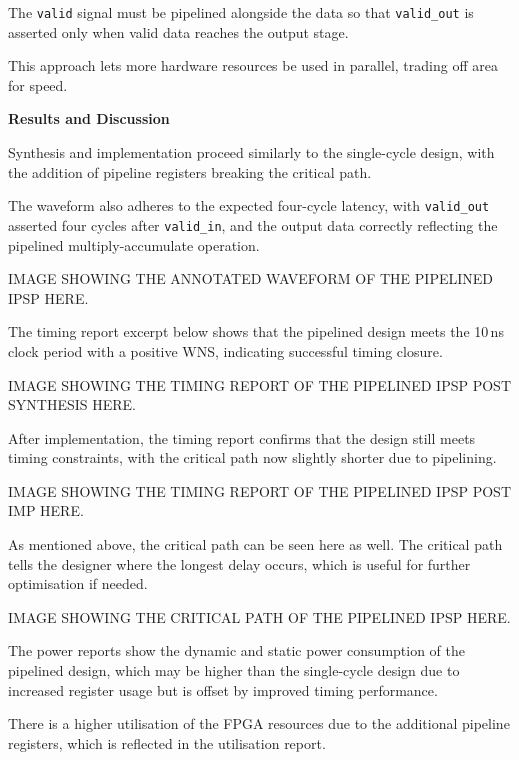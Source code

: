 \documentclass[a4paper,12pt]{article}
\begin{document}
The \texttt{valid} signal must be pipelined alongside the data so that \texttt{valid\_out} is asserted only when valid data reaches the output stage. 

This approach lets more hardware resources be used in parallel, trading off area for speed.

\textbf{Results and Discussion}

Synthesis and implementation proceed similarly to the single-cycle design, with the addition of pipeline registers breaking the critical path.

The waveform also adheres to the expected four-cycle latency, with \texttt{valid\_out} asserted four cycles after \texttt{valid\_in}, and the output data correctly reflecting the pipelined multiply-accumulate operation.

\begin{large}
    IMAGE SHOWING THE ANNOTATED WAVEFORM OF THE PIPELINED IPSP HERE.
\end{large}

The timing report excerpt below shows that the pipelined design meets the 10\,ns clock period with a positive WNS, indicating successful timing closure.

\begin{large}
    IMAGE SHOWING THE TIMING REPORT OF THE PIPELINED IPSP POST SYNTHESIS HERE.
\end{large}

After implementation, the timing report confirms that the design still meets timing constraints, with the critical path now slightly shorter due to pipelining.

\begin{large}
    IMAGE SHOWING THE TIMING REPORT OF THE PIPELINED IPSP POST IMP HERE.
\end{large}

As mentioned above, the critical path can be seen here as well. The critical path tells the designer where the longest delay occurs, which is useful for further optimisation if needed.

\begin{large}
    IMAGE SHOWING THE CRITICAL PATH OF THE PIPELINED IPSP HERE.
\end{large}

The power reports show the dynamic and static power consumption of the pipelined design, which may be higher than the single-cycle design due to increased register usage but is offset by improved timing performance. 

There is a higher utilisation of the FPGA resources due to the additional pipeline registers, which is reflected in the utilisation report.
\end{document}
